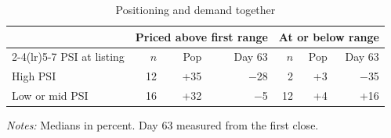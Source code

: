 \begin{table}[!htbp]\centering\footnotesize
\caption{Positioning and demand together}\label{tab:2x2}

\begin{threeparttable}
\begin{tabular}{lrrrrrr}
\toprule
& \multicolumn{3}{c}{Priced above first range} & \multicolumn{3}{c}{At or below range} \\ \cmidrule(lr){2-4}\cmidrule(lr){5-7} PSI at listing & $n$ & Pop & Day 63 & $n$ & Pop & Day 63 \\
\midrule
High PSI & 12 & +35 & $-$28 & 2 & +3 & $-$35 \\
Low or mid PSI & 16 & +32 & $-$5 & 12 & +4 & +16 \\
\bottomrule
\end{tabular}
\begin{tablenotes}[flushleft]\footnotesize
\item \textit{Notes:} Medians in percent. Day 63 measured from the first close.
\end{tablenotes}
\end{threeparttable}

\end{table}
